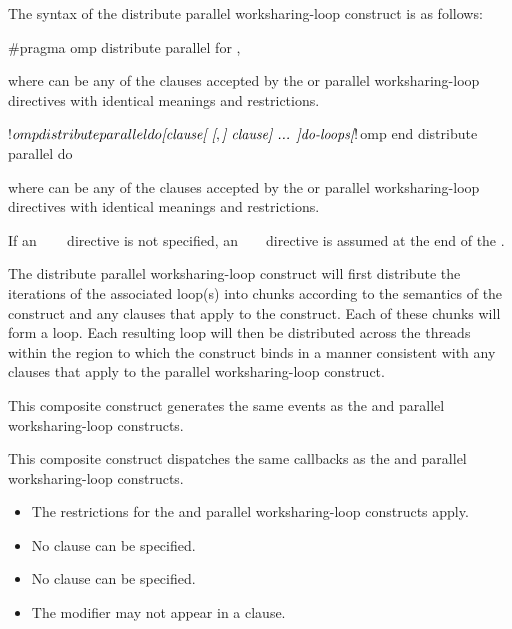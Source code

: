 \syntax
The syntax of the distribute parallel worksharing-loop construct is as follows:

\begin{ccppspecific}
\begin{ompcPragma}
#pragma omp distribute parallel for \plc{[clause[ [},\plc{] clause] ... ] newline}
\end{ompcPragma}

where  can be any of the clauses accepted by the 
or parallel worksharing-loop directives with identical meanings and restrictions.
\end{ccppspecific}

\begin{fortranspecific}
\begin{ompfPragma}
!$omp distribute parallel do \plc{[clause[ [},\plc{] clause] ... ]}
    \plc{do-loops}
\plc{[}!$omp end distribute parallel do\plc{]}
\end{ompfPragma}

where  can be any of the clauses accepted by the  or 
parallel worksharing-loop directives with identical meanings and restrictions.

If an ~~~ directive is not 
specified, an ~ ~ directive 
is assumed at the end of the .
\end{fortranspecific}

\descr
The distribute parallel worksharing-loop construct will first distribute the
iterations of the associated loop(s) into chunks according to the semantics of
the  construct and any clauses that apply to the
 construct. Each of these chunks will form a loop. Each
resulting loop will then be distributed across the threads within the
 region to which the  construct binds in a manner 
consistent with any clauses that apply to the parallel worksharing-loop construct.

\events

This composite construct generates the same events as the  
and parallel worksharing-loop constructs.

\tools

This composite construct dispatches the same callbacks as the  
and parallel worksharing-loop constructs.

\restrictions
\begin{itemize}
\item The restrictions for the  and parallel worksharing-loop 
      constructs apply.
\item No  clause can be specified.
\item No  clause can be specified.
\item The  modifier may not appear in a  clause.
\end{itemize}


